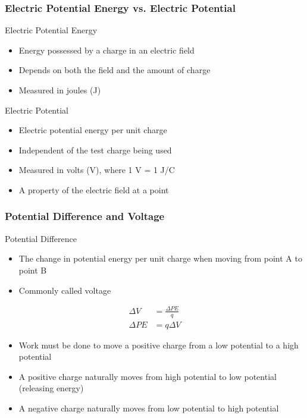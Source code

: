 \documentclass{beamer}
\begin{document}
\begin{frame}
    \frametitle{Electric Potential Energy vs. Electric Potential}
    
    \begin{block}{Electric Potential Energy}
        \begin{itemize}
            \item Energy possessed by a charge in an electric field
            \item Depends on both the field and the amount of charge
            \item Measured in joules (J)
        \end{itemize}
    \end{block}
    
    \begin{block}{Electric Potential}
        \begin{itemize}
            \item Electric potential energy per unit charge
            \item Independent of the test charge being used
            \item Measured in volts (V), where 1 V = 1 J/C
            \item A property of the electric field at a point
        \end{itemize}
    \end{block}
    
    
\end{frame}

\begin{frame}
    \frametitle{Potential Difference and Voltage}
    
    \begin{block}{Potential Difference}
        \begin{itemize}
            \item The change in potential energy per unit charge when moving from point A to point B
            \item Commonly called voltage
        \end{itemize}
    \end{block}
    
    \begin{align}
        \Delta V &= \frac{\Delta PE}{q} \\
        \Delta PE &= q \Delta V
    \end{align}

    \begin{itemize}
        \item Work must be done to move a positive charge from a low potential to a high potential
        \item A positive charge naturally moves from high potential to low potential (releasing energy)
        \item A negative charge naturally moves from low potential to high potential
    \end{itemize}
\end{frame}
\end{document}
